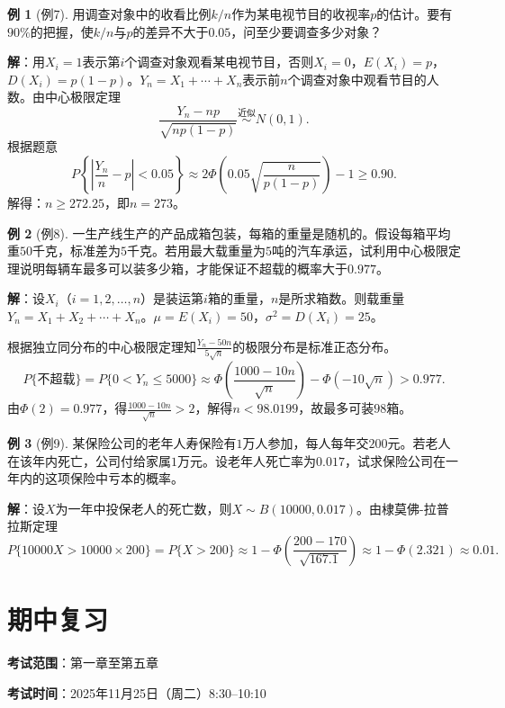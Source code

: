 \documentclass[11pt,a4paper]{report}
\theoremstyle{definition}
\newtheorem{example}{例}[chapter]
\theoremstyle{plain}
\begin{document}
\begin{example}[例7]
用调查对象中的收看比例$k/n$作为某电视节目的收视率$p$的估计。要有$90\%$的把握，使$k/n$与$p$的差异不大于$0.05$，问至少要调查多少对象？

\textbf{解}：用$X_i=1$表示第$i$个调查对象观看某电视节目，否则$X_i=0$，$E(X_i)=p$，$D(X_i)=p(1-p)$。$Y_n=X_1+\cdots+X_n$表示前$n$个调查对象中观看节目的人数。由中心极限定理
\[
\frac{Y_n-np}{\sqrt{np(1-p)}}\stackrel{\text{近似}}{\sim}N(0,1).
\]
根据题意
\[
P\left\{\left|\frac{Y_n}{n}-p\right|<0.05\right\}\approx 2\Phi\left(0.05\sqrt{\frac{n}{p(1-p)}}\right)-1\geq 0.90.
\]
解得：$n\geq 272.25$，即$n=273$。
\end{example}

\begin{example}[例8]
一生产线生产的产品成箱包装，每箱的重量是随机的。假设每箱平均重$50$千克，标准差为$5$千克。若用最大载重量为$5$吨的汽车承运，试利用中心极限定理说明每辆车最多可以装多少箱，才能保证不超载的概率大于$0.977$。

\textbf{解}：设$X_i$（$i=1,2,\ldots,n$）是装运第$i$箱的重量，$n$是所求箱数。则载重量$Y_n=X_1+X_2+\cdots+X_n$。$\mu=E(X_i)=50$，$\sigma^2=D(X_i)=25$。

根据独立同分布的中心极限定理知$\frac{Y_n-50n}{5\sqrt{n}}$的极限分布是标准正态分布。
\[
P\{\text{不超载}\}=P\{0<Y_n\leq 5000\}\approx\Phi\left(\frac{1000-10n}{\sqrt{n}}\right)-\Phi(-10\sqrt{n})>0.977.
\]
由$\Phi(2)=0.977$，得$\frac{1000-10n}{\sqrt{n}}>2$，解得$n<98.0199$，故最多可装$98$箱。
\end{example}

\begin{example}[例9]
某保险公司的老年人寿保险有$1$万人参加，每人每年交$200$元。若老人在该年内死亡，公司付给家属$1$万元。设老年人死亡率为$0.017$，试求保险公司在一年内的这项保险中亏本的概率。

\textbf{解}：设$X$为一年中投保老人的死亡数，则$X\sim B(10000,0.017)$。由棣莫佛-拉普拉斯定理
\[
P\{10000X>10000\times 200\}=P\{X>200\}\approx 1-\Phi\left(\frac{200-170}{\sqrt{167.1}}\right)\approx 1-\Phi(2.321)\approx 0.01.
\]
\end{example}

\newpage

\chapter{期中复习}

\textbf{考试范围}：第一章至第五章

\textbf{考试时间}：2025年11月25日（周二）8:30--10:10
\end{document}
